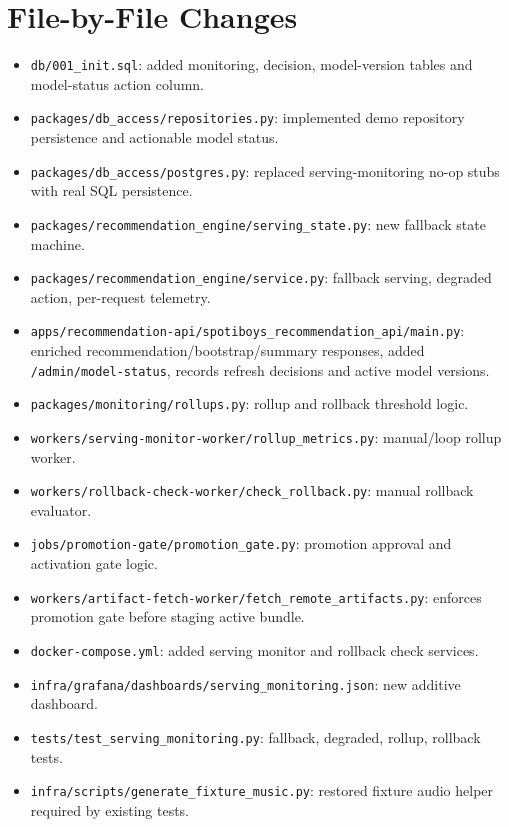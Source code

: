 \documentclass[11pt]{article}
\begin{document}
\section*{File-by-File Changes}
\begin{itemize}[leftmargin=*]
  \item \texttt{db/001\_init.sql}: added monitoring, decision, model-version tables and model-status action column.
  \item \texttt{packages/db\_access/repositories.py}: implemented demo repository persistence and actionable model status.
  \item \texttt{packages/db\_access/postgres.py}: replaced serving-monitoring no-op stubs with real SQL persistence.
  \item \texttt{packages/recommendation\_engine/serving\_state.py}: new fallback state machine.
  \item \texttt{packages/recommendation\_engine/service.py}: fallback serving, degraded action, per-request telemetry.
  \item \texttt{apps/recommendation-api/spotiboys\_recommendation\_api/main.py}: enriched recommendation/bootstrap/summary responses, added \texttt{/admin/model-status}, records refresh decisions and active model versions.
  \item \texttt{packages/monitoring/rollups.py}: rollup and rollback threshold logic.
  \item \texttt{workers/serving-monitor-worker/rollup\_metrics.py}: manual/loop rollup worker.
  \item \texttt{workers/rollback-check-worker/check\_rollback.py}: manual rollback evaluator.
  \item \texttt{jobs/promotion-gate/promotion\_gate.py}: promotion approval and activation gate logic.
  \item \texttt{workers/artifact-fetch-worker/fetch\_remote\_artifacts.py}: enforces promotion gate before staging active bundle.
  \item \texttt{docker-compose.yml}: added serving monitor and rollback check services.
  \item \texttt{infra/grafana/dashboards/serving\_monitoring.json}: new additive dashboard.
  \item \texttt{tests/test\_serving\_monitoring.py}: fallback, degraded, rollup, rollback tests.
  \item \texttt{infra/scripts/generate\_fixture\_music.py}: restored fixture audio helper required by existing tests.
\end{itemize}
\end{document}
